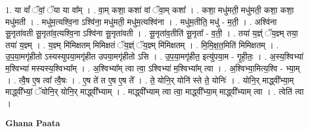 \documentclass[17pt]{extarticle}
\begin{document}
1. या वां᳚ ॅवां॒ ॅया या वा᳚म् । . वा॒म् कशा॒ कशा॑ वां ॅवा॒म् कशा᳚ । . कशा॒ मधु॑मती॒ मधु॑मती॒ कशा॒ कशा॒ मधु॑मती । . मधु॑म॒त्यश्वि॒ना ऽश्वि॑ना॒ मधु॑मती॒ मधु॑म॒त्यश्वि॑ना । . मधु॑म॒तीति॒ मधु॑ - म॒ती॒ । . अश्वि॑ना सू॒नृता॑वती सू॒नृता॑व॒त्यश्वि॒ना ऽश्वि॑ना सू॒नृता॑वती । . सू॒नृता॑व॒तीति॑ सू॒नृता᳚ - व॒ती॒ । . तया॑ य॒ज्ञ्ं ॅय॒ज्ञ्म् तया॒ तया॑ य॒ज्ञ्म् । . य॒ज्ञ्म् मि॑मिक्षतम् मिमिक्षतं ॅय॒ज्ञ्ं ॅय॒ज्ञ्म् मि॑मिक्षतम् । . मि॒मि॒क्ष॒त॒मिति॑ मिमिक्षतम् । . उ॒प॒या॒मगृ॑हीतो ऽस्यस्युपया॒मगृ॑हीत उपया॒मगृ॑हीतो ऽसि । . उ॒प॒या॒मगृ॑हीत॒ इत्यु॑पया॒म - गृ॒ही॒तः॒ । . अ॒स्य॒श्विभ्या॑ म॒श्विभ्या॑ मस्यस्य॒श्विभ्या᳚म् । . अ॒श्विभ्या᳚म् त्वा त्वा॒ ऽश्विभ्या॑ म॒श्विभ्या᳚म् त्वा । . अ॒श्विभ्या॒मित्य॒श्वि - भ्या॒म् । . त्वै॒ष ए॒ष त्वा᳚ त्वै॒षः । . ए॒ष ते॑ त ए॒ष ए॒ष ते᳚ । . ते॒ योनि॒र् योनि॑ स्ते ते॒ योनिः॑ । . योनि॒र् माद्ध्वी᳚भ्या॒म् माद्ध्वी᳚भ्यां॒ ॅयोनि॒र् योनि॒र् माद्ध्वी᳚भ्याम् । . माद्ध्वी᳚भ्याम् त्वा त्वा॒ माद्ध्वी᳚भ्या॒म् माद्ध्वी᳚भ्याम् त्वा । . त्वेति॑ त्वा । \newline

\textbf{Ghana Paata } \newline
\end{document}
